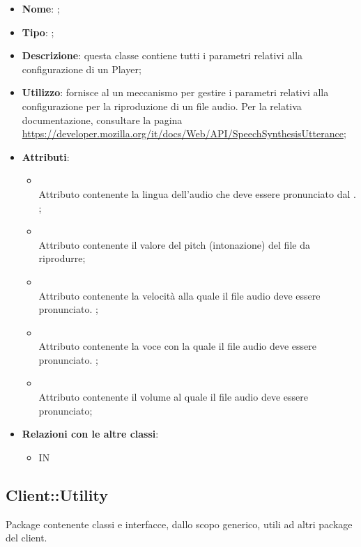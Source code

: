 \begin{itemize}
	\item \textbf{Nome}: ;
	\item \textbf{Tipo}: ;
	\item \textbf{Descrizione}: questa classe contiene tutti i parametri relativi alla configurazione di un Player;
	\item \textbf{Utilizzo}: fornisce al  un meccanismo per gestire i parametri relativi alla configurazione per la riproduzione di un file audio.
Per la relativa documentazione, consultare la pagina \url{https://developer.mozilla.org/it/docs/Web/API/SpeechSynthesisUtterance};
	\item \textbf{Attributi}:
	\begin{itemize}
		\item[]  \\
		Attributo contenente la lingua dell'audio che deve essere pronunciato dal . ;
		\item[]  \\
		Attributo contenente il valore del pitch (intonazione) del file da riprodurre;
		\item[]  \\
		Attributo contenente la velocità alla quale il file audio deve essere pronunciato. ;
		\item[]  \\
		Attributo contenente la voce con la quale il file audio deve essere pronunciato. ;
		\item[]  \\
		Attributo contenente il volume al quale il file audio deve essere pronunciato;
	\end{itemize}
	\item \textbf{Relazioni con le altre classi}:
	\begin{itemize}
		\item IN \hyperlink{Player_label}{}
	\end{itemize}
\end{itemize}

\subsection{Client::Utility}
Package contenente classi e interfacce, dallo scopo generico, utili ad altri package del client.
